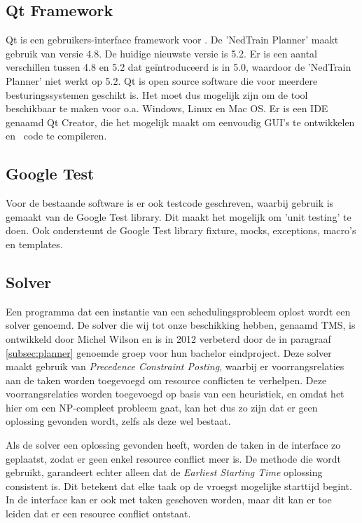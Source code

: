 \subsection{Qt Framework}
Qt is een gebruikers-interface framework voor \cpp . De 'NedTrain Planner' maakt gebruik van versie 4.8. De huidige nieuwste versie is 5.2. Er is een aantal verschillen tussen 4.8 en 5.2 dat ge\"introduceerd is in 5.0, waardoor de 'NedTrain Planner' niet werkt op 5.2. Qt is open source software die voor meerdere besturingssystemen geschikt is. Het moet dus mogelijk zijn om de tool beschikbaar te maken voor o.a. Windows, Linux en Mac OS. Er is een IDE genaamd Qt Creator, die het mogelijk maakt om eenvoudig GUI's te ontwikkelen en \cpp\ code te compileren. \cite{seminarium2014}

\subsection{Google Test}
Voor de bestaande software is er ook testcode geschreven, waarbij gebruik is gemaakt van de Google Test library. Dit maakt het mogelijk om 'unit testing' te doen. Ook ondersteunt de Google Test library fixture, mocks, exceptions, macro's en templates.

\subsection{Solver}
\label{subsec:solver}

Een programma dat een instantie van een schedulingsprobleem oplost wordt een solver genoemd. De solver die wij tot onze beschikking hebben, genaamd TMS, is ontwikkeld door Michel Wilson en is in 2012 verbeterd door de in paragraaf \ref{subsec:planner} genoemde groep voor hun bachelor eindproject. Deze solver maakt gebruik van \emph{Precedence Constraint Posting}, waarbij er voorrangsrelaties aan de taken worden toegevoegd om resource conflicten te verhelpen. \cite{seminarium2014} Deze voorrangsrelaties worden toegevoegd op basis van een heuristiek, en omdat het hier om een NP-compleet probleem gaat, kan het dus zo zijn dat er geen oplossing gevonden wordt, zelfs als deze wel bestaat.

Als de solver een oplossing gevonden heeft, worden de taken in de interface zo geplaatst, zodat er geen enkel resource conflict meer is. De methode die wordt gebruikt, garandeert echter alleen dat de \emph{Earliest Starting Time} oplossing consistent is. Dit betekent dat elke taak op de vroegst mogelijke starttijd begint. In de interface kan er ook met taken geschoven worden, maar dit kan er toe leiden dat er een resource conflict ontstaat. 
